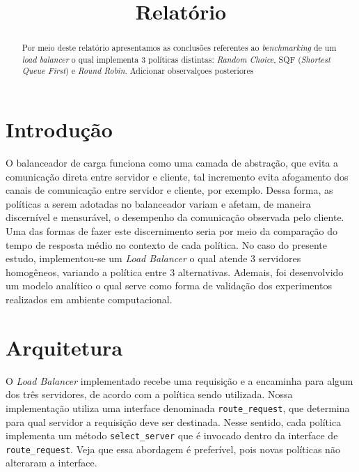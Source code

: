 \documentclass[conference]{IEEEtran}
\begin{document}
\title{Relatório}

\author{
\and
{}
}

\maketitle

\begin{abstract}
 Por meio deste relatório apresentamos as conclusões referentes ao \textit{benchmarking} de um \textit{load balancer} o qual implementa 3 políticas distintas: \textit{Random Choice}, SQF (\textit{Shortest Queue First}) e \textit{Round Robin}. Adicionar observalçoes posteriores 
\end{abstract}

\section{Introdução}

\noindent O balanceador de carga funciona como uma camada de abstração, que evita a comunicação direta entre servidor e cliente, tal incremento evita afogamento dos canais de comunicação entre servidor e cliente, por exemplo. Dessa forma, as políticas a serem adotadas no balanceador variam e afetam, de maneira discernível e mensurável, o desempenho da comunicação observada pelo cliente. Uma das formas de fazer este discernimento seria por meio da comparação do tempo de resposta médio no contexto de cada política. No caso do presente estudo, implementou-se um \textit{Load Balancer} o qual atende 3 servidores homogêneos, variando a política entre 3 alternativas. Ademais, foi desenvolvido um modelo analítico o qual serve como forma de validação dos experimentos realizados em ambiente computacional.

\section{Arquitetura}

\noindent O \textit{Load Balancer} implementado recebe uma requisição e a encaminha para algum dos três servidores, de acordo com a política sendo utilizada. Nossa implementação utiliza uma interface denominada \texttt{route\_request}, que determina para qual servidor a requisição deve ser destinada. Nesse sentido, cada política implementa um método \texttt{select\_server} que é invocado dentro da interface de \texttt{route\_request}. Veja que essa abordagem é preferível, pois novas políticas não alteraram a interface.
\end{document}

